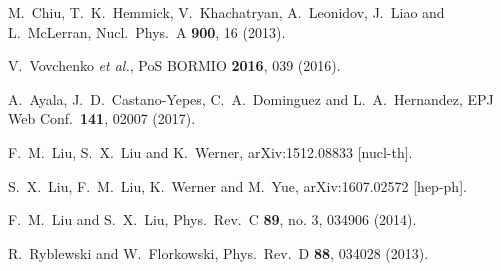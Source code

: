 \documentclass[aps,prc,a4paper,nofootinbib,
preprintnumbers,superscriptaddress,twocolumn,showpacs,showkeys]{revtex4}
\begin{document}
\begin{thebibliography}{99}
  M.~Chiu, T.~K.~Hemmick, V.~Khachatryan, A.~Leonidov, J.~Liao and L.~McLerran,
  Nucl.\ Phys.\ A {\bf 900}, 16 (2013).
  
  V.~Vovchenko {\it et al.},
  PoS BORMIO {\bf 2016}, 039 (2016).
  
  A.~Ayala, J.~D.~Castano-Yepes, C.~A.~Dominguez and L.~A.~Hernandez,
  EPJ Web Conf.\  {\bf 141}, 02007 (2017).


  F.~M.~Liu, S.~X.~Liu and K.~Werner,
  arXiv:1512.08833 [nucl-th].
  
  S.~X.~Liu, F.~M.~Liu, K.~Werner and M.~Yue,
  arXiv:1607.02572 [hep-ph].
  
  F.~M.~Liu and S.~X.~Liu,
  Phys.\ Rev.\ C {\bf 89}, no. 3, 034906 (2014).


  R.~Ryblewski and W.~Florkowski,
  Phys.\ Rev.\ D {\bf 88}, 034028 (2013).


\end{thebibliography}
\end{document}
